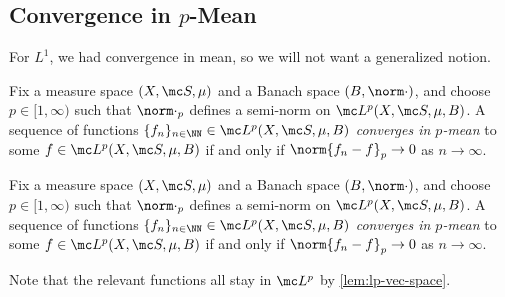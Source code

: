 \documentclass[../notes.tex]{subfiles}
\begin{document}
\subsection{Convergence in \texorpdfstring{$p$}{ p}-Mean}
For $L^1$, we had convergence in mean, so we will not want a generalized notion.
\begin{defihelper} 
	Fix a measure space $(X,\mc S,\mu)$ and a Banach space $(B,\norm\cdot)$, and choose $p\in[1,\infty)$ such that $\norm\cdot_p$ defines a semi-norm on $\mc L^p(X,\mc S,\mu,B)$. A sequence of functions $\{f_n\}_{n\in\NN}\in\mc L^p(X,\mc S,\mu,B)$ \textit{converges in $p$-mean} to some $f\in\mc L^p(X,\mc S,\mu,B)$ if and only if $\norm{f_n-f}_p\to0$ as $n\to\infty$.
\end{defihelper}
\begin{defihelper} 
	Fix a measure space $(X,\mc S,\mu)$ and a Banach space $(B,\norm\cdot)$, and choose $p\in[1,\infty)$ such that $\norm\cdot_p$ defines a semi-norm on $\mc L^p(X,\mc S,\mu,B)$. A sequence of functions $\{f_n\}_{n\in\NN}\in\mc L^p(X,\mc S,\mu,B)$ \textit{converges in $p$-mean} to some $f\in\mc L^p(X,\mc S,\mu,B)$ if and only if $\norm{f_n-f}_p\to0$ as $n\to\infty$.
\end{defihelper}
Note that the relevant functions all stay in $\mc L^p$ by \autoref{lem:lp-vec-space}.
\end{document}
